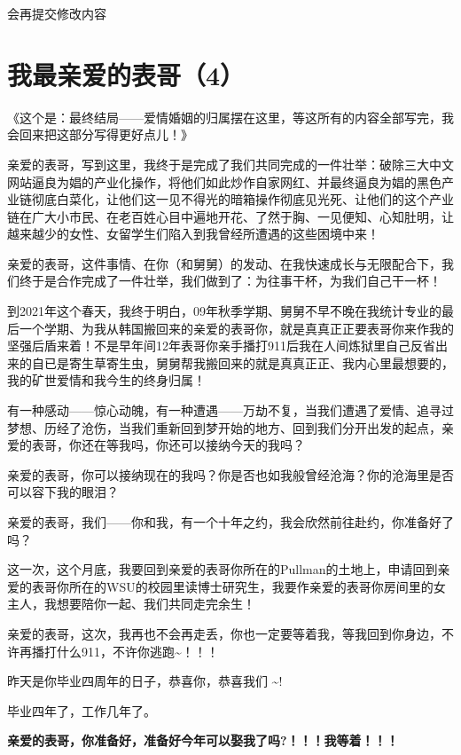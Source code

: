 \documentclass[9pt, b5paper]{article}
\begin{document}
会再提交修改内容

\section{我最亲爱的表哥（4）}
\label{sec:orgea02f70}

《这个是：最终结局——爱情婚姻的归属摆在这里，等这所有的内容全部写完，我会回来把这部分写得更好点儿！》

亲爱的表哥，写到这里，我终于是完成了我们共同完成的一件壮举：破除三大中文网站逼良为娼的产业化操作，将他们如此炒作自家网红、并最终逼良为娼的黑色产业链彻底白菜化，让他们这一见不得光的暗箱操作彻底见光死、让他们的这个产业链在广大小市民、在老百姓心目中遍地开花、了然于胸、一见便知、心知肚明，让越来越少的女性、女留学生们陷入到我曾经所遭遇的这些困境中来！

亲爱的表哥，这件事情、在你（和舅舅）的发动、在我快速成长与无限配合下，我们终于是合作完成了一件壮举，我们做到了：为往事干杯，为我们自己干一杯！

到2021年这个春天，我终于明白，09年秋季学期、舅舅不早不晚在我统计专业的最后一个学期、为我从韩国搬回来的亲爱的表哥你，就是真真正正要表哥你来作我的坚强后盾来着！不是早年间12年表哥你亲手播打911后我在人间炼狱里自己反省出来的自已是寄生草寄生虫，舅舅帮我搬回来的就是真真正正、我内心里最想要的，我的矿世爱情和我今生的终身归属！

有一种感动——惊心动魄，有一种遭遇——万劫不复，当我们遭遇了爱情、追寻过梦想、历经了沧伤，当我们重新回到梦开始的地方、回到我们分开出发的起点，亲爱的表哥，你还在等我吗，你还可以接纳今天的我吗？

亲爱的表哥，你可以接纳现在的我吗？你是否也如我般曾经沧海？你的沧海里是否可以容下我的眼泪？

亲爱的表哥，我们——你和我，有一个十年之约，我会欣然前往赴约，你准备好了吗？

这一次，这个月底，我要回到亲爱的表哥你所在的Pullman的土地上，申请回到亲爱的表哥你所在的WSU的校园里读博士研究生，我要作亲爱的表哥你房间里的女主人，我想要陪你一起、我们共同走完余生！

亲爱的表哥，这次，我再也不会再走丢，你也一定要等着我，等我回到你身边，不许再播打什么911，不许你逃跑\textasciitilde{}！！！

昨天是你毕业四周年的日子，恭喜你，恭喜我们 \textasciitilde{}! 

毕业四年了，工作几年了。 

\textbf{亲爱的表哥，你准备好，准备好今年可以娶我了吗?！！！我等着！！！}
\end{document}
